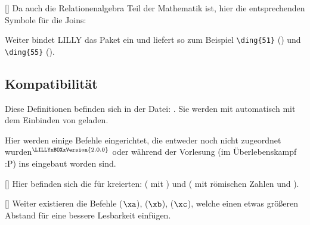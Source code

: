 [\cmdlist {}\cmdlist {}\cmdlist {}]
Da auch die Relationenalgebra Teil der Mathematik ist, hier die entsprechenden Symbole für die Joins:
%
%
%
\begin{bemerkung}
    Weiter bindet LILLY das  Paket ein und liefert so zum Beispiel \verb|\ding{51}| () und \verb|\ding{55}| ().
\end{bemerkung}









\subsection[Kompatibilität \LILLYxBOXxVersion{\small 1.0.3}]{Kompatibilität}
Diese Definitionen befinden sich in der Datei: . Sie werden mit  automatisch mit dem Einbinden von  geladen.\medskip

Hier werden einige Befehle eingerichtet, die entweder noch nicht zugeordnet wurden\({}^{\tiny \LILLYxBOXxVersion{\tiny 2.0.0}}\) oder während der Vorlesung (im Überlebenskampf :P) ins  eingebaut worden sind.

%
%
%

[\cmdlist {}]
Hier befinden sich die für \la kreierten:  ( mit \newline{}) und  ( mit römischen Zahlen und \newline{}).

%
%
%

[\cmdlist {}\cmdlist {}]
Weiter existieren die Befehle  ($\xa$),  ($\xb$),  ($\xc$), welche einen etwas größeren Abstand für eine bessere Lesbarkeit einfügen.

%
%
%


